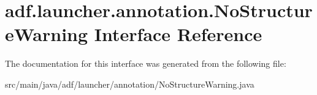 \hypertarget{interfaceadf_1_1launcher_1_1annotation_1_1NoStructureWarning}{}\section{adf.\+launcher.\+annotation.\+No\+Structure\+Warning Interface Reference}
\label{interfaceadf_1_1launcher_1_1annotation_1_1NoStructureWarning}


The documentation for this interface was generated from the following file\+:\begin{DoxyCompactItemize}
\item 
src/main/java/adf/launcher/annotation/No\+Structure\+Warning.\+java\end{DoxyCompactItemize}
